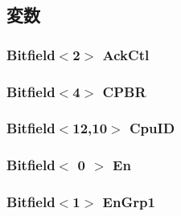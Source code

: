 \subsection{変数}
\hypertarget{classVGic_a66b61167f5695385dad02f2b536d0184}{
\subsubsection[{AckCtl}]{\setlength{\rightskip}{0pt plus 5cm}Bitfield$<$2$>$ {\bf AckCtl}}}
\label{classVGic_a66b61167f5695385dad02f2b536d0184}
\hypertarget{classVGic_a08a6b10064e3d9e0c614063665d33c54}{
\subsubsection[{CPBR}]{\setlength{\rightskip}{0pt plus 5cm}Bitfield$<$4$>$ {\bf CPBR}}}
\label{classVGic_a08a6b10064e3d9e0c614063665d33c54}
\hypertarget{classVGic_af2592449a23aee37bc8cf6be36d2efc3}{
\subsubsection[{CpuID}]{\setlength{\rightskip}{0pt plus 5cm}Bitfield$<$12,10$>$ {\bf CpuID}}}
\label{classVGic_af2592449a23aee37bc8cf6be36d2efc3}
\hypertarget{classVGic_a6c33fee90de41b22938ac6bf2bbf0b37}{
\subsubsection[{En}]{\setlength{\rightskip}{0pt plus 5cm}Bitfield$<$ 0 $>$ {\bf En}}}
\label{classVGic_a6c33fee90de41b22938ac6bf2bbf0b37}
\hypertarget{classVGic_abd1b3356359eb92893a437944f5a292f}{
\subsubsection[{EnGrp1}]{\setlength{\rightskip}{0pt plus 5cm}Bitfield$<$1$>$ {\bf EnGrp1}}}
